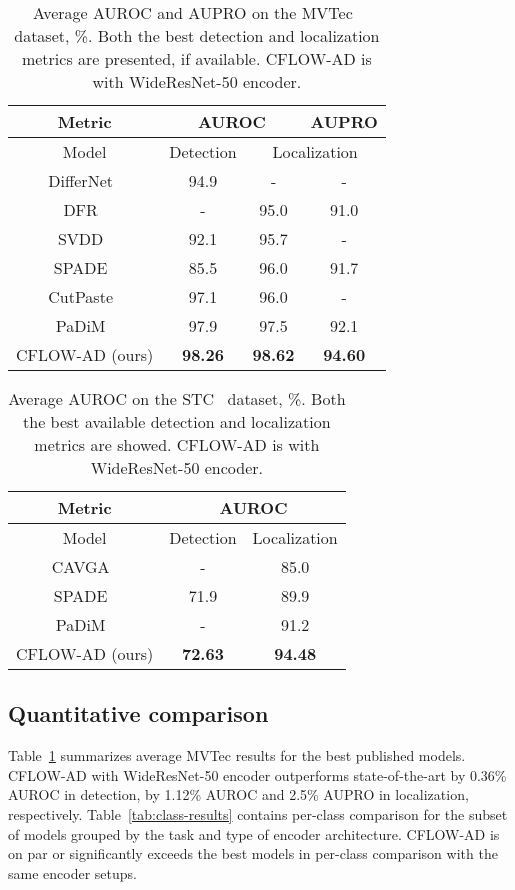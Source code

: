 \documentclass[10pt,twocolumn,letterpaper]{article}
\begin{document}
\begin{table}[t]
	\caption{Average AUROC and AUPRO on the MVTec~\cite{Bergmann_2019_CVPR} dataset, \%. Both the best detection and localization metrics are presented, if available. CFLOW-AD is with WideResNet-50 encoder.}
	\label{tab:mvtec-results}
	\centering
	\begin{tabular}{c|c|c|c}
		\toprule
		Metric & \multicolumn{2}{c|}{AUROC} & AUPRO\\
		\midrule
		Model & Detection & \multicolumn{2}{c}{Localization}\\
		\midrule
		DifferNet~\cite{rudolph2020differnet} &94.9&-&-\\
		DFR~\cite{DFR2020} &-&95.0&91.0\\
		SVDD~\cite{Yi_2020_ACCV} &92.1&95.7&-\\
		SPADE~\cite{cohen2021subimage} &85.5&96.0&91.7\\
		CutPaste~\cite{li2021cutpaste} &97.1&96.0&-\\
		PaDiM~\cite{defard2020padim} &97.9&97.5&92.1\\
		\midrule
		CFLOW-AD (ours) &\textbf{98.26}&\textbf{98.62}&\textbf{94.60} \\
		\bottomrule
	\end{tabular}
\end{table}

\begin{table}[t]
	\caption{Average AUROC on the STC~\cite{Luo_2017_ICCV} dataset, \%. Both the best available detection and localization metrics are showed. CFLOW-AD is with WideResNet-50 encoder.}
	\label{tab:stc-results}
	\centering
	\begin{tabular}{c|c|c}
		\toprule
		Metric & \multicolumn{2}{c}{AUROC}\\
		\midrule
		Model & Detection & Localization\\
		\midrule
		CAVGA~\cite{cavga} &-&85.0\\
		SPADE~\cite{cohen2021subimage} &71.9&89.9\\
		PaDiM~\cite{defard2020padim} &-&91.2\\
		\midrule
		CFLOW-AD (ours) &\textbf{72.63}&\textbf{94.48}\\
		\bottomrule
	\end{tabular}
\end{table}

\subsection{Quantitative comparison}
\label{subsec:quant_eval}
Table~\ref{tab:mvtec-results} summarizes average MVTec results for the best published models. CFLOW-AD with WideResNet-50 encoder outperforms state-of-the-art by 0.36\% AUROC in detection, by 1.12\% AUROC and 2.5\% AUPRO in localization, respectively. Table~\ref{tab:class-results} contains per-class comparison for the subset of models grouped by the task and type of encoder architecture. CFLOW-AD is on par or significantly exceeds the best models in per-class comparison with the same encoder setups.
\end{document}
